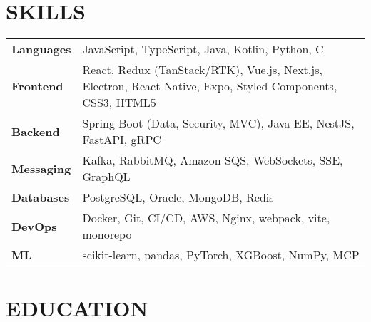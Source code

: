 \documentclass[11pt,a4paper]{moderncv}
\renewcommand\small{\fontsize{9}{10}\selectfont}
\begin{document}
\vspace{-1em}

\section{SKILLS}
{\renewcommand{\arraystretch}{1.05}
\setlength{\tabcolsep}{4pt} %
\begin{tabularx}{\linewidth}{@{}>{\small\bfseries}l >{\small}X@{}}
Languages & JavaScript, TypeScript, Java, Kotlin, Python, C \\ [0.25em]
Frontend  & React, Redux (TanStack/RTK), Vue.js, Next.js, Electron, React Native, Expo, Styled Components, CSS3, HTML5 \\ [0.25em]
Backend   & Spring Boot (Data, Security, MVC), Java EE, NestJS, FastAPI, gRPC \\ [0.25em]
Messaging & Kafka, RabbitMQ, Amazon SQS, WebSockets, SSE, GraphQL \\ [0.25em]
Databases & PostgreSQL, Oracle, MongoDB, Redis\\ [0.25em]
DevOps    & Docker, Git, CI/CD, AWS, Nginx, webpack, vite, monorepo \\ [0.25em]
ML & scikit-learn, pandas, PyTorch, XGBoost, NumPy, MCP
\end{tabularx}
}
\section{EDUCATION}
\vspace{0.5em}
\newlength{\EduGap}
\setlength{\EduGap}{4mm} %
\end{document}
